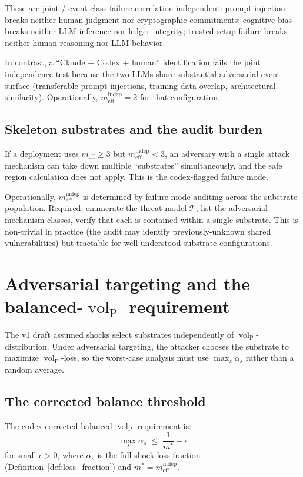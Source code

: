 \documentclass{article}
\DeclareMathOperator{\vol}{vol}
\newcommand{\volL}{{\vol_{\mathrm{P}}}}
\newcommand{\meff}{m_{\mathrm{eff}}}
\newcommand{\mindep}{m_{\mathrm{eff}}^{\mathrm{indep}}}
\begin{document}
These are joint / event-class failure-correlation independent: prompt
injection breaks neither human judgment nor cryptographic commitments;
cognitive bias breaks neither LLM inference nor ledger integrity;
trusted-setup failure breaks neither human reasoning nor LLM behavior.

In contrast, a ``Claude + Codex + human'' identification fails the
joint independence test because the two LLMs share substantial
adversarial-event surface (transferable prompt injections, training
data overlap, architectural similarity).  Operationally,
$\mindep = 2$ for that configuration.

\subsection{Skeleton substrates and the audit burden}

If a deployment uses $\meff \geq 3$ but $\mindep < 3$, an adversary
with a single attack mechanism can take down multiple ``substrates''
simultaneously, and the safe region calculation does not apply.  This
is the codex-flagged failure mode.

Operationally, $\mindep$ is determined by failure-mode auditing
across the substrate population.  Required: enumerate the threat
model $\mathcal{T}$, list the adversarial mechanism classes, verify
that each is contained within a single substrate.  This is
non-trivial in practice (the audit may identify previously-unknown
shared vulnerabilities) but tractable for well-understood substrate
configurations.

\section{Adversarial targeting and the balanced-$\volL$ requirement}

The v1 draft assumed shocks select substrates independently of
$\volL$-distribution.  Under adversarial targeting, the attacker
chooses the substrate to maximize $\volL$-loss, so the worst-case
analysis must use $\max_s \alpha_s$ rather than a random average.

\subsection{The corrected balance threshold}

The codex-corrected balanced-$\volL$ requirement is:
\begin{equation}
\label{eq:balance}
\max_s \alpha_s \;\leq\; \frac{1}{m^*} + \epsilon
\end{equation}
for small $\epsilon > 0$, where $\alpha_s$ is the full shock-loss
fraction (Definition~\ref{def:loss_fraction}) and $m^* = \mindep$.
\end{document}

